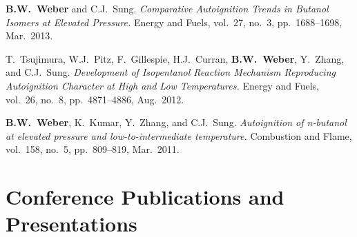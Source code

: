 \begin{bibmune}
\item \textbf{B.W.\ Weber} and C.J.\ Sung. \textit{Comparative
        Autoignition Trends in Butanol Isomers at Elevated Pressure.}
        Energy and Fuels, vol.\ 27, no.\ 3, pp.\ 1688--1698, Mar.\ 2013. \\

\item T.\ Tsujimura, W.J.\ Pitz, F.\ Gillespie, H.J.\ Curran,
        \textbf{B.W.\ Weber}, Y.\ Zhang, and C.J.\ Sung.
        \textit{Development of Isopentanol Reaction Mechanism
        Reproducing Autoignition Character at High and Low
        Temperatures.} Energy and Fuels, vol.\ 26, no.\ 8, pp.\ 4871--4886,
        Aug.\ 2012. 

\item \textbf{B.W.\ Weber}, K.\ Kumar, Y.\ Zhang, and C.J.\ Sung.
        \textit{Autoignition of n-butanol at elevated pressure and
        low-to-intermediate temperature.} Combustion and Flame,
        vol.\ 158, no.\ 5, pp.\ 809--819, Mar.\ 2011.
\end{bibmune}


\section{{\sectionfont Conference Publications and Presentations}}

